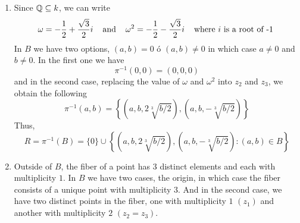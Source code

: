 \documentclass{article}
\begin{document}
\begin{enumerate}
    \item[(b)] Since $\mathbb{Q}\subseteq k$, we can write
    \begin{equation*}
        \omega=-\frac{1}{2}+\frac{\sqrt{3}}{2}i \hspace{4mm}\text{and}\hspace{4mm} 
        \omega^{2}=-\frac{1}{2}-\frac{\sqrt{3}}{2}i \hspace{4mm}\text{where $i$ is a root of -1 }
    \end{equation*}
    In $B$ we have two options, $(a,b)=0$ ó $(a,b)\neq0$ in which case $a\neq0$ and $b\neq0$. In
    the first one we have
    \begin{equation*}
        \pi^{-1}(0,0)=(0,0,0)
    \end{equation*}
    and in the second case, replacing the value of $\omega$ and $\omega^{2}$ into $z_{2}$ and 
    $z_{3}$, we obtain the following
    \begin{equation*}
        \pi^{-1}(a,b)=\left\{
            \left(a,b,2\sqrt[3]{b/2}\right),\left(a,b,-\sqrt[3]{b/2}\right)
        \right\}
    \end{equation*}
    Thus,
    \begin{equation*}
        R=\pi^{-1}(B)=\{0\}\cup\left\{
            \left(a,b,2\sqrt[3]{b/2}\right),\left(a,b,-\sqrt[3]{b/2}\right):(a,b)\in B
        \right\}
    \end{equation*}

    \item[(d)] Outside of $B$, the fiber of a point has $3$ distinct elements and each with 
    multiplicity $1$. In $B$ we have two cases, the origin, in which case the fiber consists of a 
    unique point with multiplicity $3$. And in the second case, we have two distinct points in
    the fiber, one with multiplicity $1$ $(z_{1})$ and another with multiplicity $2$ 
    $(z_{2}=z_{3})$.
\end{enumerate}
\end{document}

